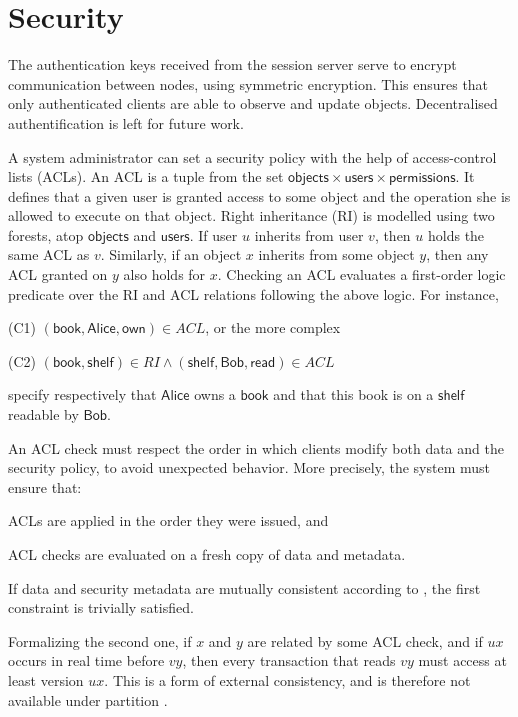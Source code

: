 \section{Security}

The authentication keys received from the session server serve to
encrypt communication between nodes, using symmetric encryption.
This ensures that only authenticated clients are able to observe and
update objects.
Decentralised authentification \cite{sec:rep:1823} is left for future
work.

A system administrator can set a security policy with the help of access-control lists (ACLs).
An ACL is a tuple from the set $\mathsf{objects} \times \mathsf{users} \times \mathsf{permissions}$.
It defines that a given user is granted access to some object and the operation she is allowed to execute on that object.
Right inheritance (RI) is modelled using two forests, atop $\mathsf{objects}$ and $\mathsf{users}$.
%
If user $u$ inherits from user $v$, then $u$ holds the same ACL as $v$.
Similarly, if an object $x$ inherits from some object $y$, then any ACL granted on $y$ also holds for $x$.
Checking an ACL evaluates a first-order logic predicate over the RI and ACL relations following the above logic.
For instance,
\begin{inparaitem}
\item[(C1)] $(\mathsf{book}, \mathsf{Alice}, \mathsf{own}) \in ACL$, or the more complex\\
\item[(C2)] $(\mathsf{book}, \mathsf{shelf}) \in RI \land (\mathsf{shelf}, \mathsf{Bob}, \mathsf{read}) \in ACL$
\end{inparaitem}
specify respectively that $\mathsf{Alice}$ owns a $\mathsf{book}$ and that this book is on a $\mathsf{shelf}$ readable by $\mathsf{Bob}$.

An ACL check must respect the order in which clients modify both data
and the security policy, to avoid unexpected behavior.
More precisely, the system must ensure \cite{sec:rep:1842} that:
\begin{inparaenum}[\textit (i)]
\item
  ACLs are applied in the order they were issued, and
\item
  ACL checks are evaluated on a fresh copy of data and metadata.
\end{inparaenum}
If data and security metadata are mutually consistent according to
\tccp, the first constraint is trivially satisfied.

Formalizing the second one, if $x$ and $y$ are related by some ACL
check, and if $ux$ occurs in real time before $vy$, then every
transaction that reads $vy$ must access at least version $ux$. This is
a form of external consistency, and is therefore not available under
partition \cite{rep:pan:1628}.

